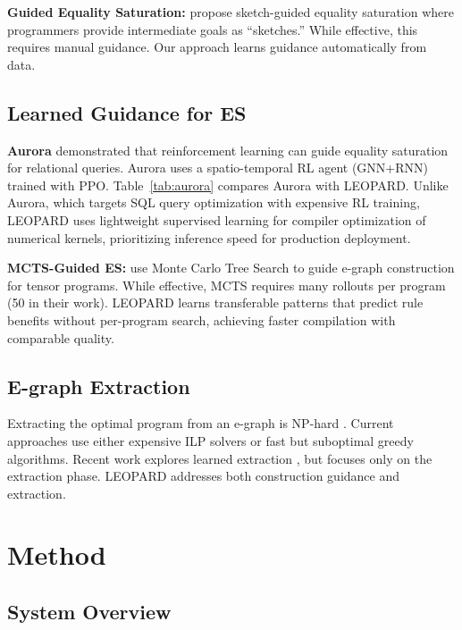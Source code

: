 \documentclass{article}
\begin{document}
\textbf{Guided Equality Saturation:} \citet{koehler2024guided} propose sketch-guided equality saturation where programmers provide intermediate goals as ``sketches.'' While effective, this requires manual guidance. Our approach learns guidance automatically from data.

\subsection{Learned Guidance for ES}

\textbf{Aurora} \citep{barbulescu2024aurora} demonstrated that reinforcement learning can guide equality saturation for relational queries. Aurora uses a spatio-temporal RL agent (GNN+RNN) trained with PPO. Table~\ref{tab:aurora} compares Aurora with LEOPARD. Unlike Aurora, which targets SQL query optimization with expensive RL training, LEOPARD uses lightweight supervised learning for compiler optimization of numerical kernels, prioritizing inference speed for production deployment.

\textbf{MCTS-Guided ES:} \citet{hartmann2024optimizing} use Monte Carlo Tree Search to guide e-graph construction for tensor programs. While effective, MCTS requires many rollouts per program (50 in their work). LEOPARD learns transferable patterns that predict rule benefits without per-program search, achieving faster compilation with comparable quality.

\subsection{E-graph Extraction}

Extracting the optimal program from an e-graph is NP-hard \citep{goharshady2024fast}. Current approaches use either expensive ILP solvers or fast but suboptimal greedy algorithms. Recent work explores learned extraction \citep{yang2021smartemu}, but focuses only on the extraction phase. LEOPARD addresses both construction guidance and extraction.

\section{Method}
\label{sec:method}

\subsection{System Overview}
\end{document}
